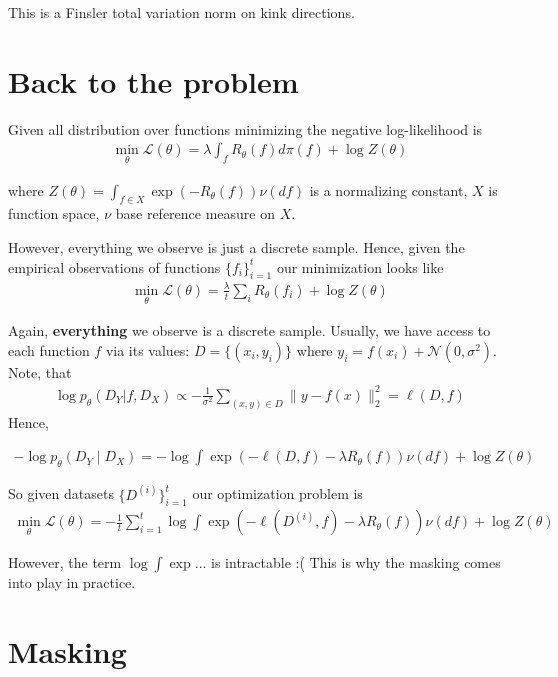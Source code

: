 This is a Finsler total variation norm on kink directions.



\section{Back to the problem}
Given all distribution over functions minimizing the negative log-likelihood is
\begin{align*}
	\min_\theta \mathcal{L}(\theta) =
	\lambda \int_{f} R_\theta(f)d\pi(f)
	+
	\log Z(\theta)
\end{align*}


where  $Z(\theta) = \int_{f \in X} \exp(-R_\theta(f)) \nu(df)$ is a normalizing constant, $X$ is function space, $\nu$ base reference measure on $X$.

However, everything we observe is just a discrete sample. Hence, given the empirical observations of functions $\{ f_i \}_{i=1}^t$ our minimization looks like
\begin{align*}
	\min_\theta \mathcal{L}(\theta) =  \frac{\lambda}{t} \sum_{i} R_\theta(f_i) + \log Z(\theta)
\end{align*}

Again, \textbf{everything} we observe is a discrete sample. Usually, we have access to each function $f$ via its values: $D = \{(x_i, y_i)\}$ where $y_i = f(x_i) + \mathcal{N}(0, \sigma^2)$. Note, that
\begin{align*}
	\log p_{\theta}(D_Y | f, D_X) \propto - \frac{1}{\sigma^2}\sum_{(x, y) \in D} \|y - f(x)\|_2^2
	= \ell(D, f)
\end{align*}
Hence,

\begin{align*}
	-\log p_\theta\left(D_Y \mid D_X\right)=-\log \int \exp \left(-\ell(D, f)-\lambda R_\theta(f)\right) \nu(d f)+\log Z(\theta)
\end{align*}

So given datasets $\{ D^{(i)} \}_{i=1}^t$ our optimization problem is
\begin{align}\label{eq:loss-w-data}
	\min_\theta \mathcal{L}(\theta) =
	-\frac{1}{t} \sum_{i=1}^t \log \int \exp \left(-\ell\left(D^{(i)}, f\right)-\lambda R_\theta(f)\right) \nu(d f)+\log Z(\theta)
\end{align}

However, the term $\log \int \exp \ldots $ is intractable :( This is why the masking comes into play in practice.

\section{Masking}

